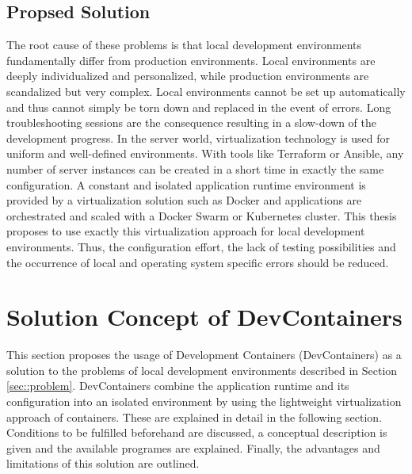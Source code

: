 \documentclass[12pt, a4paper]{article}
\begin{document}
        \subsection{Propsed Solution}
        The root cause of these problems is that local development environments fundamentally differ from production environments. Local environments are deeply individualized and personalized, while production environments are scandalized but very complex. Local environments cannot be set up automatically and thus cannot simply be torn down and replaced in the event of errors. Long troubleshooting sessions are the consequence resulting in a slow-down of the development progress.\newline
        In the server world, virtualization technology is used for uniform and well-defined environments. With tools like Terraform or Ansible, any number of server instances can be created in a short time in exactly the same configuration. A constant and isolated application runtime environment is provided by a virtualization solution such as Docker and applications are orchestrated and scaled with a Docker Swarm or Kubernetes cluster.\newline
        This thesis proposes to use exactly this virtualization approach for local development environments. Thus, the configuration effort, the lack of testing possibilities and the occurrence of local and operating system specific errors should be reduced.

\section{Solution Concept of DevContainers}\label{sec::solution_concept}
This section proposes the usage of Development Containers (DevContainers) as a solution to the problems of local development environments described in Section \ref{sec::problem}. DevContainers combine the application runtime and its configuration into an isolated environment by using the lightweight virtualization approach of containers. These are explained in detail in the following section. Conditions to be fulfilled beforehand are discussed, a conceptual description is given and the available programes are explained. Finally, the advantages and limitations of this solution are outlined.
\end{document}
